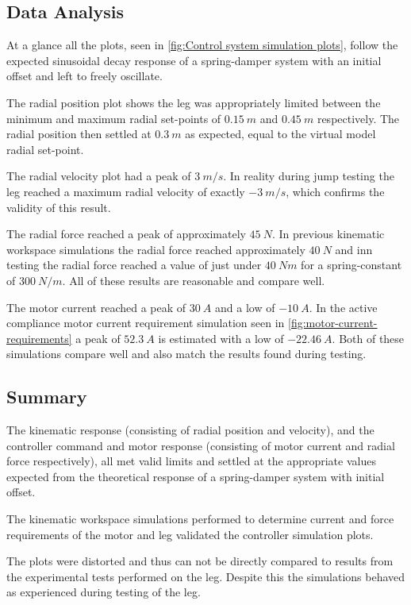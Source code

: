 \subsection{Data Analysis}

At a glance all the plots, seen in \cref{fig:Control system simulation plots}, follow the expected sinusoidal decay response of a spring-damper system with an initial offset and left to freely oscillate.  

The radial position plot shows the leg was appropriately limited between the minimum and maximum radial set-points of $0.15\ m$ and $0.45\ m$ respectively. The radial position then settled at $0.3\ m$ as expected, equal to the virtual model radial set-point.

The radial velocity plot had a peak of $3\ m/s$. In reality during jump testing the leg reached a maximum radial velocity of exactly $-3\ m/s$, which confirms the validity of this result.

The radial force reached a peak of approximately $45\ N$. In previous kinematic workspace simulations the radial force reached approximately $40\ N$ and inn testing the radial force reached a value of just under $40\ Nm$ for a spring-constant of $300\ N/m$. All of these results are reasonable and compare well.

The motor current reached a peak of $30\ A$ and a low of $-10\ A$. In the active compliance motor current requirement simulation seen in \cref{fig:motor-current-requirements} a peak of $52.3\ A$ is estimated with a low of $-22.46\ A$. Both of these simulations compare well and also match the results found during testing.

\subsection{Summary}

The kinematic response (consisting of radial position and velocity), and the controller command and motor response (consisting of motor current and radial force respectively), all met valid limits and settled at the appropriate values expected from the theoretical response of a spring-damper system with initial offset.

The kinematic workspace simulations performed to determine current and force requirements of the motor and leg validated the controller simulation plots.

The plots were distorted and thus can not be directly compared to results from the experimental tests performed on the leg. Despite this the simulations behaved as experienced during testing of the leg. 

